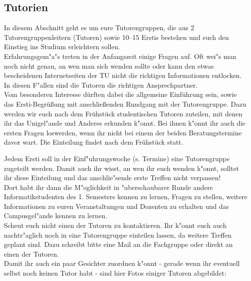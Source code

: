 \subsection{Tutorien}



In diesem Abschnitt geht es um eure Tutorengruppen, die aus 2 Tutorengruppenleitern (Tutoren) sowie 10--15 Erstis bestehen und euch den Einstieg ins Studium erleichtern sollen.\\
Erfahrungsgem"a"s treten in der Anfangszeit einige Fragen auf. Oft wei"s man noch nicht genau, an wen man sich wenden sollte oder kann den etwas bescheidenen Internetseiten der TU nicht die richtigen Informationen entlocken. In diesen F"allen sind die Tutoren die richtigen Ansprechpartner.\\

Vom besonderen Interesse dürften dabei die allgemeine Einführung sein,
sowie das Ersti-Begrüßung mit anschließenden Rundgang mit der
Tutorengruppe.
Dazu werden wir euch nach dem Frühstück studentischen 
Tutoren zuteilen, mit denen ihr das Unigel"ande und Anderes erkunden 
k"onnt. Bei ihnen k"onnt ihr auch die ersten Fragen loswerden, wenn 
ihr nicht bei einem der beiden Beratungstermine davor wart.
Die Einteilung findet nach dem Frühstück statt.

Jedem Ersti soll in der Einf"uhrungswoche (s. Termine) eine Tutorengruppe zugeteilt werden. Damit auch ihr wisst, an wen ihr euch wenden k"onnt, solltet ihr diese Einteilung und das anschlie"sende erste Treffen nicht verpassen!\\
Dort habt ihr dann die M"oglichkeit in "uberschaubarer Runde andere Informatikstudenten des 1. Semesters kennen zu lernen, Fragen zu stellen, weitere Informationen zu euren Veranstaltungen und Dozenten zu erhalten und das Campusgel"ande kennen zu lernen.\\
Scheut euch nicht einen der Tutoren zu kontaktieren. Ihr k"onnt euch auch nachtr"aglich noch in eine Tutorengruppe einteilen lassen, da weitere Treffen geplant sind. Dazu schreibt bitte eine Mail an die Fachgruppe  oder direkt an einen der Tutoren.\\
Damit ihr auch ein paar Gesichter zuordnen k"onnt - gerade wenn ihr eventuell selbst noch keinen Tutor habt - sind hier Fotos einiger Tutoren abgebildet:

